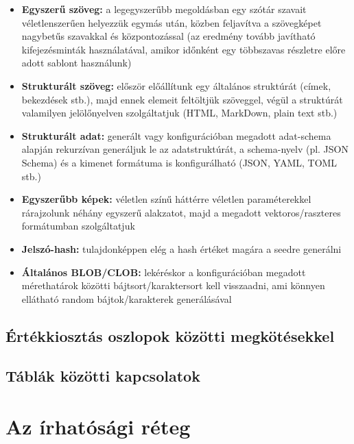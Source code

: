 \documentclass[
    parspace, %
    noindent, %
]{elteiktdk}[2023/10/30]
\begin{document}
\begin{itemize}
  \item \textbf{Egyszerű szöveg:}
    a legegyszerűbb megoldásban egy szótár szavait véletlenszerűen helyezzük egymás után,
    közben feljavítva a szövegképet nagybetűs szavakkal és központozással
    (az eredmény tovább javítható kifejezésminták használatával,
    amikor időnként egy többszavas részletre előre adott sablont használunk)
  \item \textbf{Strukturált szöveg:}
    először előállítunk egy általános struktúrát (címek, bekezdések stb.),
    majd ennek elemeit feltöltjük szöveggel,
    végül a struktúrát valamilyen jelölőnyelven szolgáltatjuk (HTML, MarkDown, plain text stb.)
  \item \textbf{Strukturált adat:}
    generált vagy konfigurációban megadott adat-schema alapján rekurzívan generáljuk le az adatstruktúrát,
    a schema-nyelv (pl. JSON Schema) és a kimenet formátuma is konfigurálható (JSON, YAML, TOML stb.)
  \item \textbf{Egyszerűbb képek:}
    véletlen színű háttérre véletlen paraméterekkel
    rárajzolunk néhány egyszerű alakzatot,
    majd a megadott vektoros/raszteres formátumban szolgáltatjuk
  \item \textbf{Jelszó-hash:}
    tulajdonképpen elég a hash értéket magára a seedre generálni
  \item \textbf{Általános BLOB/CLOB:}
    lekéréskor a konfigurációban megadott mérethatárok közötti bájtsort/karaktersort kell visszaadni,
    ami könnyen ellátható random bájtok/karakterek generálásával
\end{itemize}

\subsection{Értékkiosztás oszlopok közötti megkötésekkel}


\subsection{Táblák közötti kapcsolatok}


\section{Az írhatósági réteg}
\end{document}
